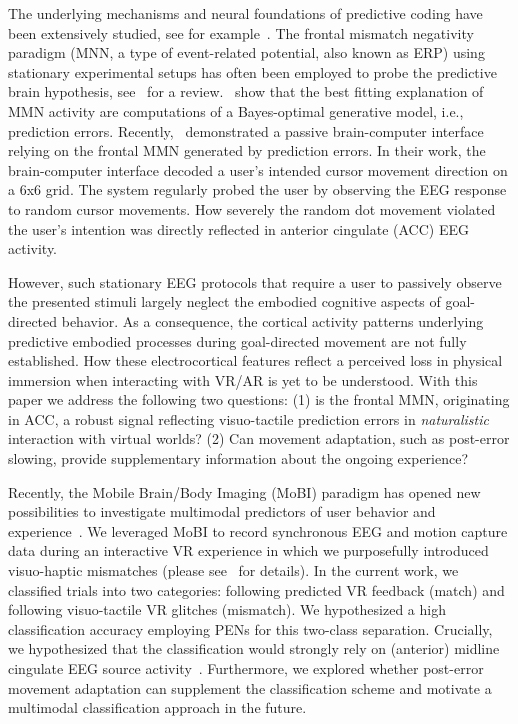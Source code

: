 The underlying mechanisms and neural foundations of predictive coding have been extensively studied, see for example~\cite{Holroyd2002-in, Clark2013-ah, Bendixen2012-jx}. The frontal mismatch negativity paradigm (MNN, a type of event-related potential, also known as ERP) using stationary experimental setups has often been employed to probe the predictive brain hypothesis, see~\cite{Stefanics2014-vk} for a review.~\cite{Lieder2013-dl} show that the best fitting explanation of MMN activity are computations of a Bayes-optimal generative model, i.e., prediction errors. Recently,~\cite{Zander2016-ed} demonstrated a passive brain-computer interface relying on the frontal MMN generated by prediction errors. In their work, the brain-computer interface decoded a user's intended cursor movement direction on a 6x6 grid. The system regularly probed the user by observing the EEG response to random cursor movements. How severely the random dot movement violated the user's intention was directly reflected in anterior cingulate (ACC) EEG activity. 

However, such stationary EEG protocols that require a user to passively observe the presented stimuli largely neglect the embodied cognitive aspects of goal-directed behavior. As a consequence, the cortical activity patterns underlying predictive embodied processes during goal-directed movement are not fully established. How these electrocortical features reflect a perceived loss in physical immersion when interacting with VR/AR is yet to be understood. With this paper we address the following two questions: (1) is the frontal MMN, originating in ACC, a robust signal reflecting visuo-tactile prediction errors in \textit{naturalistic} interaction with virtual worlds? (2) Can movement adaptation, such as post-error slowing, provide supplementary information about the ongoing experience?

Recently, the Mobile Brain/Body Imaging (MoBI) paradigm has opened new possibilities to investigate multimodal predictors of user behavior and experience~\cite{Makeig2009-je, Gramann2011-fr, Gramann2014-qo, Jungnickel2019-mv}. We leveraged MoBI to record synchronous EEG and motion capture data during an interactive VR experience in which we purposefully introduced visuo-haptic mismatches (please see~\cite{Gehrke2019-og} for details). In the current work, we classified trials into two categories: following predicted VR feedback (match) and following visuo-tactile VR glitches (mismatch). We hypothesized a high classification accuracy employing PENs for this two-class separation. Crucially, we hypothesized that the classification would strongly rely on (anterior) midline cingulate EEG source activity~\cite{Zander2016-ed, Tollner2017-rm}. Furthermore, we explored whether post-error movement adaptation can supplement the classification scheme and motivate a multimodal classification approach in the future. 



